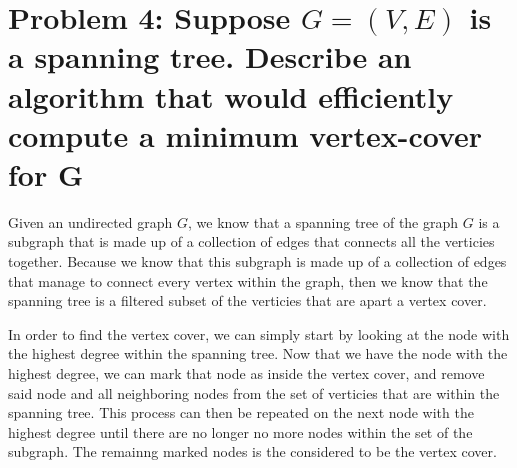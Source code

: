 \documentclass{article}
\begin{document}
\section*{Problem 4: Suppose $G = (V, E)$ is a spanning tree. Describe an algorithm that would
efficiently compute a minimum vertex-cover for G}

Given an undirected graph $G$, we know that a spanning tree of the graph $G$ is a subgraph that is made up of a collection of edges that connects all the verticies together. Because we know that this subgraph is made up of a collection of edges that manage to connect every vertex within the graph, then we know that the spanning tree is a filtered subset of the verticies that are apart a vertex cover. 

In order to find the vertex cover, we can simply start by looking at the node with the highest degree within the spanning tree. Now that we have the node with the highest degree, we can mark that node as inside the vertex cover, and remove said node and all neighboring nodes from the set of verticies that are within the spanning tree. This process can then be repeated on the next node with the highest degree until there are no longer no more nodes within the set of the subgraph. The remainng marked nodes is the considered to be the vertex cover. 
\end{document}
